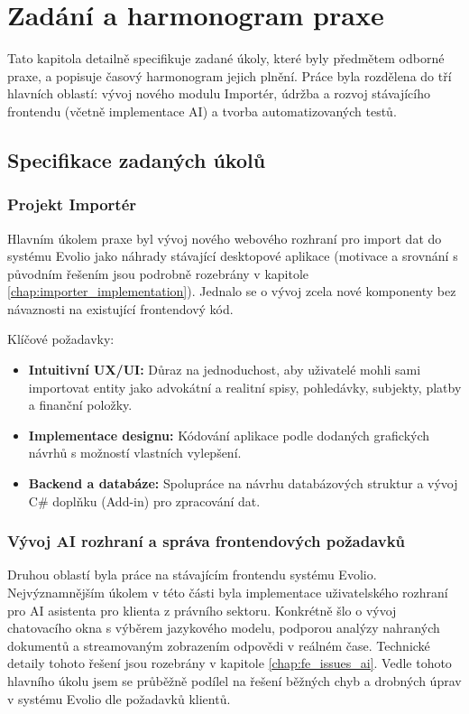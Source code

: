 \chapter{Zadání a harmonogram praxe}
\label{chap:assignment_schedule}

Tato kapitola detailně specifikuje zadané úkoly, které byly předmětem odborné praxe, a popisuje časový harmonogram jejich plnění. Práce byla rozdělena do tří hlavních oblastí: vývoj nového modulu Importér, údržba a rozvoj stávajícího frontendu (včetně implementace AI) a tvorba automatizovaných testů.

\section{Specifikace zadaných úkolů}

\subsection{Projekt Importér}
Hlavním úkolem praxe byl vývoj nového webového rozhraní pro import dat do systému Evolio jako náhrady stávající desktopové aplikace (motivace a srovnání s původním řešením jsou podrobně rozebrány v kapitole \ref{chap:importer_implementation}). Jednalo se o vývoj zcela nové komponenty bez návaznosti na existující frontendový kód.

Klíčové požadavky:
\begin{itemize}
    \item \textbf{Intuitivní UX/UI:} Důraz na jednoduchost, aby uživatelé mohli sami importovat entity jako advokátní a realitní spisy, pohledávky, subjekty, platby a finanční položky.
    \item \textbf{Implementace designu:} Kódování aplikace podle dodaných grafických návrhů s možností vlastních vylepšení.
    \item \textbf{Backend a databáze:} Spolupráce na návrhu databázových struktur a vývoj C\# doplňku (Add-in) pro zpracování dat.
\end{itemize}

\subsection{Vývoj AI rozhraní a správa frontendových požadavků}
Druhou oblastí byla práce na stávajícím frontendu systému Evolio. Nejvýznamnějším úkolem v této části byla implementace uživatelského rozhraní pro AI asistenta pro klienta z právního sektoru. Konkrétně šlo o vývoj chatovacího okna s výběrem jazykového modelu, podporou analýzy nahraných dokumentů a streamovaným zobrazením odpovědi v reálném čase. Technické detaily tohoto řešení jsou rozebrány v kapitole \ref{chap:fe_issues_ai}. Vedle tohoto hlavního úkolu jsem se průběžně podílel na řešení běžných chyb a drobných úprav v systému Evolio dle požadavků klientů.

